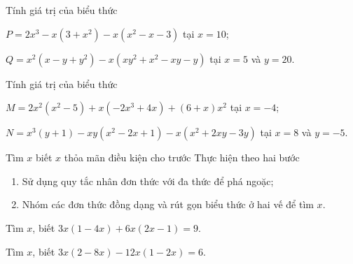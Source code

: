 \begin{vd}%
Tính giá trị của biểu thức
    \begin{listEX}[1]
        \item $P=2x^3-x(3+x^2)-x(x^2-x-3)$ tại $x=10$; 
        \item $Q=x^2(x-y+y^2)-x(xy^2+x^2-xy-y)$ tại $x=5$ và $y=20$. 
    \end{listEX}
\end{vd}
\begin{vd}%
Tính giá trị của biểu thức
    \begin{listEX}[1]
        \item $M=2x^2(x^2-5)+x(-2x^3+4x)+(6+x)x^2$ tại $x=-4$; 
        \item $N=x^3(y+1)-xy(x^2-2x+1)-x(x^2+2xy-3y)$ tại $x=8$ và $y=-5$. 
    \end{listEX}
\end{vd}
\begin{dang}{Tìm $x$ biết $x$ thỏa mãn điều kiện cho trước}
Thực hiện theo hai bước
    \begin{enumerate}[B1.]
        \item Sử dụng quy tắc nhân đơn thức với đa thức để phá ngoặc;
        \item Nhóm các đơn thức đồng dạng và rút gọn biểu thức ở hai vế để tìm $x$.
    \end{enumerate}
\end{dang}
\begin{vd}%
    Tìm $x$, biết $ 3x(1-4x)+6x(2x-1)=9 $.
\end{vd}
\begin{vd}%
    Tìm $x$, biết $ 3x(2-8x)-12x(1-2x)=6. $
\end{vd}

